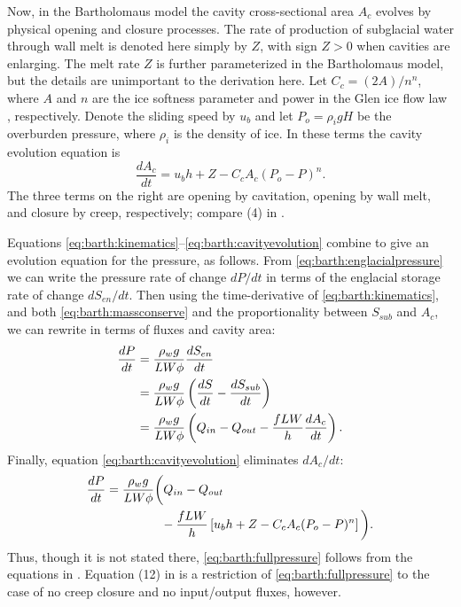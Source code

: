 \documentclass[twocolumn]{igs}
\begin{document}
Now, in the Bartholomaus model the cavity cross-sectional area $A_c$ evolves by physical opening and closure processes.  The rate of production of subglacial water through wall melt is denoted here simply by $Z$, with sign $Z>0$ when cavities are enlarging.  The melt rate $Z$ is further parameterized in the Bartholomaus model, but the details are unimportant to the derivation here.  Let $C_c = (2 A)/n^n$, where $A$ and $n$ are the ice softness parameter and power in the Glen ice flow law \citep{Glen}, respectively.  Denote the sliding speed by $u_b$ and let $P_o=\rho_i g H$ be the overburden pressure, where $\rho_i$ is the density of ice.  In these terms the cavity evolution equation is
\begin{equation}
\frac{dA_c}{dt} = u_b h + Z - C_c A_c (P_o-P)^n.  \label{eq:barth:cavityevolution}
\end{equation}
The three terms on the right are opening by cavitation, opening by wall melt, and closure by creep, respectively; compare (4) in \cite{Bartholomausetal2011}.

Equations \eqref{eq:barth:kinematics}--\eqref{eq:barth:cavityevolution} combine to give an evolution equation for the pressure, as follows.  From \eqref{eq:barth:englacialpressure} we can write the pressure rate of change $dP/dt$ in terms of the englacial storage rate of change $d S_{en}/dt$.  Then using the time-derivative of \eqref{eq:barth:kinematics}, and both \eqref{eq:barth:massconserve} and the proportionality between $S_{sub}$ and $A_c$, we can rewrite in terms of fluxes and cavity area:
\begin{align}
\frac{dP}{dt} &= \frac{\rho_w g}{L W \phi} \frac{d S_{en}}{dt} \\
&= \frac{\rho_w g}{L W \phi} \left(\frac{d S}{dt} - \frac{d S_{sub}}{dt}\right) \notag \\
&= \frac{\rho_w g}{L W \phi} \left(Q_{in} - Q_{out} - \frac{f L W}{h} \frac{d A_c}{dt}\right). \notag
\end{align}
Finally, equation \eqref{eq:barth:cavityevolution} eliminates $dA_c/dt$:
\begin{align}
&\frac{dP}{dt} = \frac{\rho_w g}{L W \phi} \bigg(Q_{in} - Q_{out} \label{eq:barth:fullpressure} \\
&\qquad \qquad \qquad - \frac{f L W}{h} \left[u_b h + Z - C_c A_c (P_o-P)^n\right]\bigg). \notag
\end{align}
Thus, though it is not stated there, \eqref{eq:barth:fullpressure} follows from the equations in \cite{Bartholomausetal2011}.  Equation (12) in \cite{Bartholomausetal2011} is a restriction of \eqref{eq:barth:fullpressure} to the case of no creep closure and no input/output fluxes, however.
\end{document}
